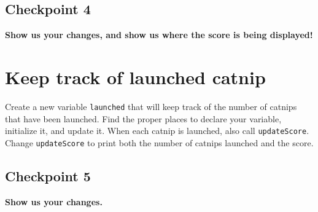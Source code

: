 \documentclass[12pt]{article}
\newcommand{\code}[1]{\texttt{#1}}
\begin{document}
\subsection*{Checkpoint 4}
{\bf Show us your changes, and show us where the score is being displayed!}

\section*{Keep track of launched catnip}
Create a new variable \code{launched} that
will keep track of the number of catnips that have been launched.
Find the proper places to declare your variable,
initialize it,
and update it.
When each catnip is launched, also call \code{updateScore}.
Change \code{updateScore}
to print both the number of catnips launched
and the score.

\subsection*{Checkpoint 5}
{\bf Show us your changes.}
\end{document}
